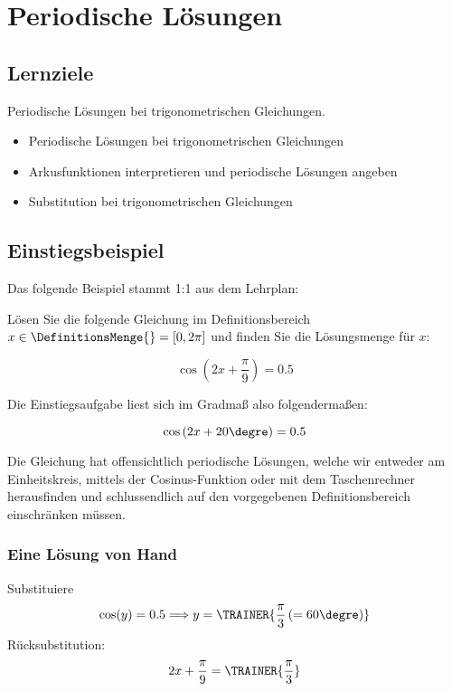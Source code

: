
\section{Periodische Lösungen}

\subsection*{Lernziele}

Periodische Lösungen bei trigonometrischen Gleichungen.

\begin{itemize}
\item Periodische Lösungen bei trigonometrischen Gleichungen
\item Arkusfunktionen interpretieren und periodische Lösungen angeben
\item Substitution bei trigonometrischen Gleichungen
\end{itemize}
\newpage


\subsection{Einstiegsbeispiel}
Das folgende Beispiel stammt 1:1 aus dem Lehrplan:

Lösen Sie die folgende Gleichung im Definitionsbereich $x \in \DefinitionsMenge{} = [ 0, 2\pi]$ und finden Sie die Lösungsmenge für $x$:

$$\cos\left(2x+\frac{\pi}{9}\right) = 0.5$$

Die Einstiegsaufgabe liest sich im Gradmaß also folgendermaßen:

$$\cos\left(2x+20\degre\right) = 0.5$$

Die Gleichung hat offensichtlich periodische Lösungen, welche wir
entweder am Einheitskreis, mittels der Cosinus-Funktion oder mit dem
Taschenrechner herausfinden und schlussendlich auf den vorgegebenen
Definitionsbereich einschränken müssen.

\subsubsection{Eine Lösung von Hand}

Substituiere 
$$\cos(y) = 0.5 \Longrightarrow y=\TRAINER{\frac{\pi}3  \left(=60\degre\right)}$$
Rücksubstitution:
$$ 2x+\frac{\pi}9 = \TRAINER{\frac{\pi}3}$$

